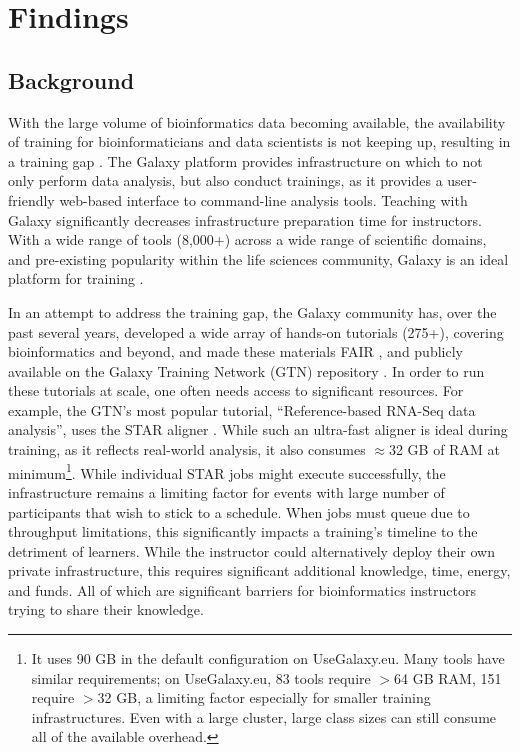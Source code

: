 \documentclass[a4paper,num-refs]{oup-contemporary}
\begin{document}
\section{Findings}
\subsection{Background}


With the large volume of bioinformatics data becoming available, the availability of training for bioinformaticians and data scientists is not keeping up, resulting in a training gap \cite{Attwood2017}.
The Galaxy platform \cite{afgan2018galaxy} provides infrastructure on which to not only perform data analysis, but also conduct trainings, as it provides a user-friendly web-based interface to command-line analysis tools. Teaching with Galaxy significantly decreases infrastructure preparation time for instructors. With a wide range of tools (8,000+) across a wide range of scientific domains, and pre-existing popularity within the life sciences community, Galaxy is an ideal platform for training \cite{gtn}.

In an attempt to address the training gap, the Galaxy community has, over the past several years, developed a wide array of hands-on tutorials (275+), covering bioinformatics and beyond, and made these materials FAIR \cite{Wilkinson2016-zo,10.1371/journal.pcbi.1007854}, and publicly available on the Galaxy Training Network (GTN) repository \cite{training-site}. In order to run these tutorials at scale, one often needs access to significant resources. For example, the GTN's most popular tutorial, ``Reference-based RNA-Seq data analysis'', uses the STAR aligner \cite{Dobin2012}. While such an ultra-fast aligner is ideal during training, as it reflects real-world analysis, it also consumes $\approx$32 GB of RAM at minimum\footnote{It uses 90 GB in the default configuration on UseGalaxy.eu. Many tools have similar requirements; on UseGalaxy.eu, 83 tools require $>$64 GB RAM, 151 require $>$32 GB, a limiting factor especially for smaller training infrastructures. Even with a large cluster, large class sizes can still consume all of the available overhead.}. While individual STAR jobs might execute successfully, the infrastructure remains a limiting factor for events with large number of participants that wish to stick to a schedule. When jobs must queue due to throughput limitations, this significantly impacts a training's timeline to the detriment of learners. While the instructor could alternatively deploy their own private infrastructure, this requires significant additional knowledge, time, energy, and funds. All of which are significant barriers for bioinformatics instructors trying to share their knowledge.
\end{document}
